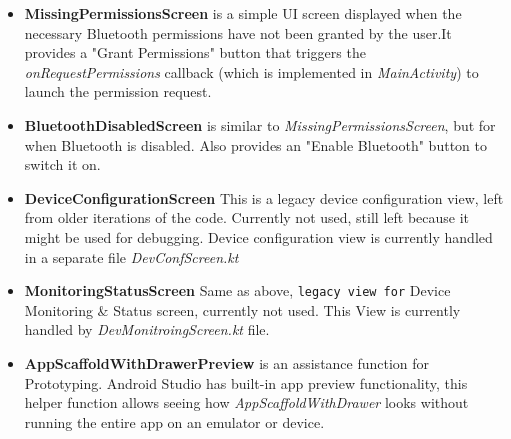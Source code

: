 \begin{itemize}
	\item \textbf{MissingPermissionsScreen} is a simple UI screen displayed when the necessary Bluetooth permissions have not been granted by the user.It provides a "Grant Permissions" button that triggers the \textit{onRequestPermissions} callback (which is implemented in \textit{MainActivity}) to launch the permission request.
	\item \textbf{BluetoothDisabledScreen} is similar to \textit{MissingPermissionsScreen}, but for when Bluetooth is disabled. Also provides an "Enable Bluetooth" button to switch it on.
	\item \textbf{DeviceConfigurationScreen} This is a legacy device configuration view, left from older iterations of the code. Currently not used, still left because it might be used for debugging. Device configuration view is currently handled in a separate file \textit{DevConfScreen.kt}
	\item \textbf{MonitoringStatusScreen} Same as above, \texttt{legacy view for} Device Monitoring \& Status screen, currently not used. This View is currently handled by \textit{DevMonitroingScreen.kt} file.
	\item \textbf{AppScaffoldWithDrawerPreview} is an assistance function for Prototyping. Android Studio has built-in app preview functionality, this helper function allows seeing how \textit{AppScaffoldWithDrawer} looks without running the entire app on an emulator or device.
\end{itemize}
